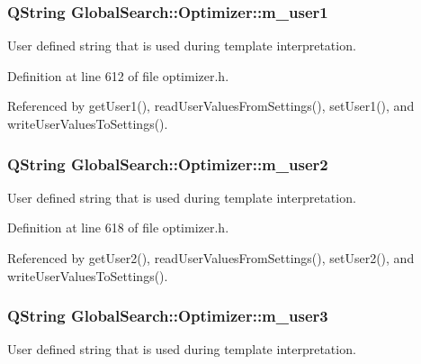 \hypertarget{classGlobalSearch_1_1Optimizer_ae300aaecb74a7a61a501e4b8bd988957}{}
\subsubsection[{m\+\_\+user1}]{\setlength{\rightskip}{0pt plus 5cm}Q\+String Global\+Search\+::\+Optimizer\+::m\+\_\+user1\hspace{0.3cm}{\ttfamily [protected]}}\label{classGlobalSearch_1_1Optimizer_ae300aaecb74a7a61a501e4b8bd988957}
User defined string that is used during template interpretation. 

Definition at line 612 of file optimizer.\+h.



Referenced by get\+User1(), read\+User\+Values\+From\+Settings(), set\+User1(), and write\+User\+Values\+To\+Settings().

\hypertarget{classGlobalSearch_1_1Optimizer_a5ca1294d2a3aa119dfab655dfa270d3a}{}
\subsubsection[{m\+\_\+user2}]{\setlength{\rightskip}{0pt plus 5cm}Q\+String Global\+Search\+::\+Optimizer\+::m\+\_\+user2\hspace{0.3cm}{\ttfamily [protected]}}\label{classGlobalSearch_1_1Optimizer_a5ca1294d2a3aa119dfab655dfa270d3a}
User defined string that is used during template interpretation. 

Definition at line 618 of file optimizer.\+h.



Referenced by get\+User2(), read\+User\+Values\+From\+Settings(), set\+User2(), and write\+User\+Values\+To\+Settings().

\hypertarget{classGlobalSearch_1_1Optimizer_a279ca8ed61d6ca36f70c5c69b4d57397}{}
\subsubsection[{m\+\_\+user3}]{\setlength{\rightskip}{0pt plus 5cm}Q\+String Global\+Search\+::\+Optimizer\+::m\+\_\+user3\hspace{0.3cm}{\ttfamily [protected]}}\label{classGlobalSearch_1_1Optimizer_a279ca8ed61d6ca36f70c5c69b4d57397}
User defined string that is used during template interpretation. 

